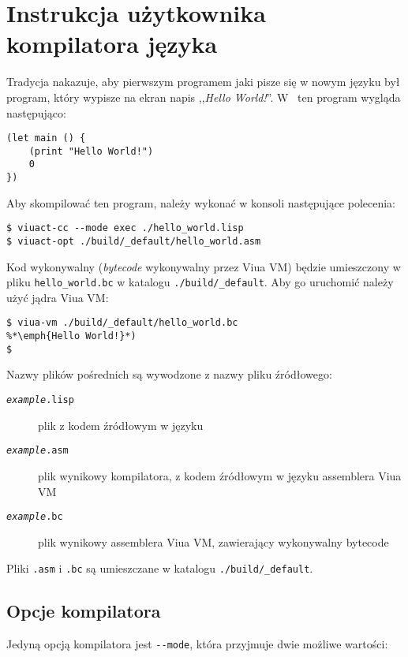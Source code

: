 \section{Instrukcja użytkownika kompilatora języka \ViuAct}
\label{viuact_manual}

Tradycja nakazuje, aby pierwszym programem jaki pisze się w nowym języku był program, który wypisze na ekran
napis ,,\emph{Hello World!}''. W \ViuAct\ ten program wygląda następująco:

\begin{lstlisting}
(let main () {
    (print "Hello World!")
    0
})
\end{lstlisting}

Aby skompilować ten program, należy wykonać w konsoli następujące polecenia:

\begin{lstlisting}
$ viuact-cc --mode exec ./hello_world.lisp
$ viuact-opt ./build/_default/hello_world.asm
\end{lstlisting}

Kod wykonywalny (\emph{bytecode} wykonywalny przez Viua VM) będzie umieszczony w pliku
\texttt{hello\_world.bc} w katalogu \texttt{./build/\_default}.
Aby go uruchomić należy użyć jądra Viua VM:

\begin{lstlisting}
$ viua-vm ./build/_default/hello_world.bc
%*\emph{Hello World!}*)
$
\end{lstlisting}

Nazwy plików pośrednich są wywodzone z nazwy pliku źródłowego:

\begin{description}
    \item[\texttt{\emph{example}.lisp}] plik z kodem źródłowym w języku \ViuAct
    \item[\texttt{\emph{example}.asm}] plik wynikowy kompilatora, z kodem źródłowym w języku assemblera Viua
        VM
    \item[\texttt{\emph{example}.bc}] plik wynikowy assemblera Viua VM, zawierający wykonywalny bytecode
\end{description}

Pliki \texttt{.asm} i \texttt{.bc} są umieszczane w katalogu \texttt{./build/\_default}.

\subsection{Opcje kompilatora}

Jedyną opcją kompilatora jest \texttt{-\phantom{}-mode}, która przyjmuje dwie możliwe wartości:

